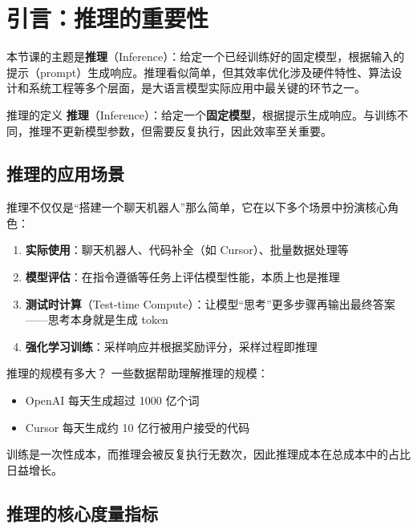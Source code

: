 \section{引言：推理的重要性}

本节课的主题是\textbf{推理}（Inference）：给定一个已经训练好的固定模型，根据输入的提示（prompt）生成响应。推理看似简单，但其效率优化涉及硬件特性、算法设计和系统工程等多个层面，是大语言模型实际应用中最关键的环节之一。

\begin{importantbox}{推理的定义}
\textbf{推理}（Inference）：给定一个\textbf{固定模型}，根据提示生成响应。与训练不同，推理不更新模型参数，但需要反复执行，因此效率至关重要。
\end{importantbox}

\subsection{推理的应用场景}

推理不仅仅是``搭建一个聊天机器人''那么简单，它在以下多个场景中扮演核心角色：

\begin{enumerate}
    \item \textbf{实际使用}：聊天机器人、代码补全（如 Cursor）、批量数据处理等
    \item \textbf{模型评估}：在指令遵循等任务上评估模型性能，本质上也是推理
    \item \textbf{测试时计算}（Test-time Compute）：让模型``思考''更多步骤再输出最终答案——思考本身就是生成 token
    \item \textbf{强化学习训练}：采样响应并根据奖励评分，采样过程即推理
\end{enumerate}

\begin{knowledgebox}{推理的规模有多大？}
一些数据帮助理解推理的规模：
\begin{itemize}
    \item OpenAI 每天生成超过 1000 亿个词
    \item Cursor 每天生成约 10 亿行被用户接受的代码
\end{itemize}
训练是一次性成本，而推理会被反复执行无数次，因此推理成本在总成本中的占比日益增长。
\end{knowledgebox}

\subsection{推理的核心度量指标}

